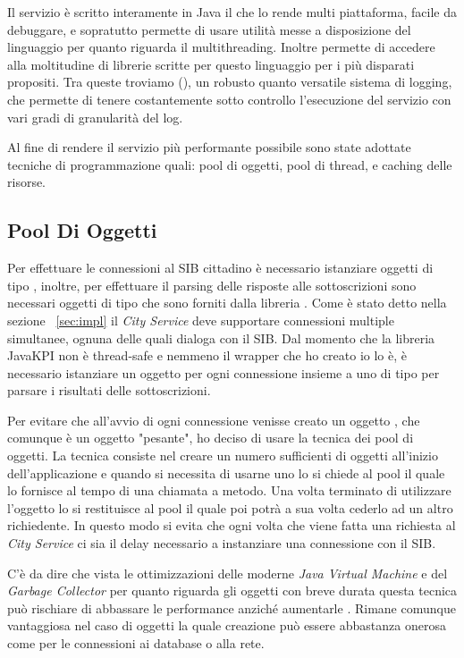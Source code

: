 Il servizio è scritto interamente in Java il che lo rende multi piattaforma, facile da debuggare, e sopratutto permette di usare utilità messe a disposizione del linguaggio per quanto riguarda il multithreading. Inoltre permette di accedere alla moltitudine di librerie scritte per questo linguaggio per i più disparati propositi. Tra queste troviamo (), un robusto quanto versatile sistema di logging, che permette di tenere costantemente sotto controllo l'esecuzione del servizio con vari gradi di granularità del log.

Al fine di rendere il servizio più performante possibile sono state adottate tecniche di programmazione quali: pool di oggetti, pool di thread, e caching delle risorse.


\subsection{Pool Di Oggetti}

Per effettuare le connessioni al SIB cittadino è necessario istanziare oggetti di tipo , inoltre, per effettuare il parsing delle risposte alle sottoscrizioni sono necessari oggetti di tipo  che sono forniti dalla libreria . Come è stato detto nella sezione ~\ref{sec:impl} il \emph{City Service} deve supportare connessioni multiple simultanee, ognuna delle quali dialoga con il SIB. Dal momento che la libreria {JavaKPI} non è thread-safe e nemmeno il wrapper che ho creato io lo è, è necessario istanziare un oggetto  per ogni connessione insieme a uno di tipo  per parsare i risultati delle sottoscrizioni.

Per evitare che all'avvio di ogni connessione venisse creato un oggetto , che comunque è un oggetto "pesante", ho deciso di usare la tecnica dei pool di oggetti. La tecnica consiste nel creare un numero sufficienti di oggetti all'inizio dell'applicazione e quando si necessita di usarne uno lo si chiede al pool il quale lo fornisce al tempo di una chiamata a metodo. Una volta terminato di utilizzare l'oggetto lo si restituisce al pool il quale poi potrà a sua volta cederlo ad un altro richiedente.
In questo modo si evita che ogni volta che viene fatta una richiesta al \emph{City Service} ci sia il delay necessario a instanziare una connessione con il SIB.

C'è da dire che vista le ottimizzazioni delle moderne \emph{Java Virtual Machine} e del \emph{Garbage Collector} per quanto riguarda gli oggetti con breve durata questa tecnica può rischiare di abbassare le performance anziché aumentarle \cite{torok2011}. Rimane comunque vantaggiosa nel caso di oggetti la quale creazione può essere abbastanza onerosa come per le connessioni ai database o alla rete.

